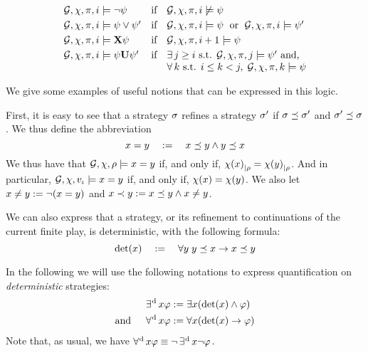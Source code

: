 \begin{definition}
\[\begin{array}{lcl}
   \CGS,\assign,\iplay,i\modelsSL \neg\psi & \text{if} &
  \CGS,\assign,\iplay,i\not\modelsSL\psi\\[3pt]
 \CGS,\assign,\iplay,i\modelsSL \psi\ou\psi' & \text{if} &
  \CGS,\assign,\iplay,i\modelsSL\psi \;\text{ or }\;
  \CGS,\assign,\iplay,i\modelsSL\psi' \\[3pt]
  \CGS,\assign,\iplay,i\modelsSL\X\psi & \text{if} &
  \CGS,\assign,\iplay,i+1\modelsSL\psi\\[3pt]
\CGS,\assign,\iplay,i\modelsSL\psi\until\psi' & \text{if} & \exists\, j\geq i
   \mbox{ s.t. }\CGS,\assign,\iplay,j\modelsSL \psi' \text{ and,}\\ 
   & & \forall\, k \text{ s.t. } i\leq k <j,
\; \CGS,\assign,\iplay,k\modelsSL \psi
\end{array}
\]
\endgroup
\end{definition}


We give some examples of useful notions that can be expressed in this
logic. 

\begin{example}
  First, it is easy to see that a strategy $\sigma$ refines a strategy
  $\sigma'$ if $\sigma \preceq \sigma'$ and
  $\sigma'\preceq\sigma$. We thus define the abbreviation
  \[x = y \quad := \quad x \preceq y \wedge y
    \preceq x\]
  We thus have that $\CGS,\assign,\fplay\models \var = \varb$ if, and
  only if, ${\chi(x)}_{|\rho}={\chi(y)}_{|\rho}$. And in
  particular, $\CGS,\assign,\pos_\init\models\var=\varb$ if, and only
  if, $\chi(x)=\chi(y)$.
  We also let $x \neq y := \neg (x = y)$ and
  $x\prec y := x \preceq y \wedge x \neq y$.
\end{example}

\begin{example}
  We can also express that a strategy, or its refinement to
  continuations of the current finite play, is deterministic, with the
  following formula:
  \[\text{det}(x) \quad := \quad \forall y \; y \preceq x \to x\preceq y\]
\end{example}

In the following we will use the following notations to express
quantification on \emph{deterministic} strategies:
\begin{align*}
\operatorname*{\exists^{\hskip.5pt\text{d}}}x \varphi & :=
\exists x (\text{det}(x) \wedge \varphi) \\
\text{and }\quad \operatorname*{\forall^{\hskip.5pt\text{d}}} x \varphi & := \forall x (\text{det}(x) \rightarrow \varphi)
\end{align*}
Note that, as usual, we have $\operatorname*{\forall^{\hskip.5pt\text{d}}} x \varphi \equiv \neg \operatorname*{\exists^{\hskip.5pt\text{d}}}x \neg \varphi$.

